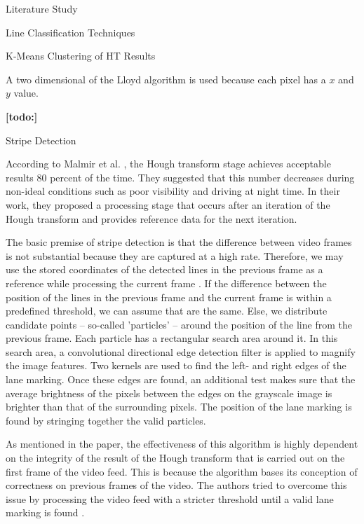 \documentclass{matthijs}
\begin{document}
\begin{hoofdstuk}{Literature Study}
\begin{paragraaf}{Line Classification Techniques}
\begin{subparagraaf}{K-Means Clustering of HT Results}
				\bigskip

				A two dimensional of the Lloyd algorithm is used because each pixel has a $x$ and $y$ value.

				\textbf{[todo:]}

			\end{subparagraaf}

			\begin{subparagraaf}{Stripe Detection}

				According to Malmir et al. \cite{malmir2019design}, the Hough transform stage achieves acceptable results 80 percent of the time.
				They suggested that this number decreases during non-ideal conditions such as poor visibility and driving at night time.
				In their work, they proposed a processing stage that occurs after an iteration of the Hough transform and provides reference data for the next iteration.

				\bigskip

				The basic premise of stripe detection is that the difference between video frames is not substantial because they are captured at a high rate.
				Therefore, we may use the stored coordinates of the detected lines in the previous frame as a reference while processing the current frame \cite{malmir2019design}.
				If the difference between the position of the lines in the previous frame and the current frame is within a predefined threshold, we can assume that are the same.
				Else, we distribute candidate points -- so-called 'particles' -- around the position of the line from the previous frame.
				Each particle has a rectangular search area around it.
				In this search area, a convolutional directional edge detection filter is applied to magnify the image features.
				Two kernels are used to find the left- and right edges of the lane marking.
				Once these edges are found, an additional test makes sure that the average brightness of the pixels between the edges on the grayscale image is brighter than that of the surrounding pixels.
				The position of the lane marking is found by stringing together the valid particles.

				\bigskip

				As mentioned in the paper, the effectiveness of this algorithm is highly dependent on the integrity of the result of the Hough transform that is carried out on the first frame of the video feed.
				This is because the algorithm bases its conception of correctness on previous frames of the video.
				The authors tried to overcome this issue by processing the video feed with a stricter threshold until a valid lane marking is found \cite{malmir2019design}.

			\end{subparagraaf}

		\end{paragraaf}

	\end{hoofdstuk}
	
\end{document}
